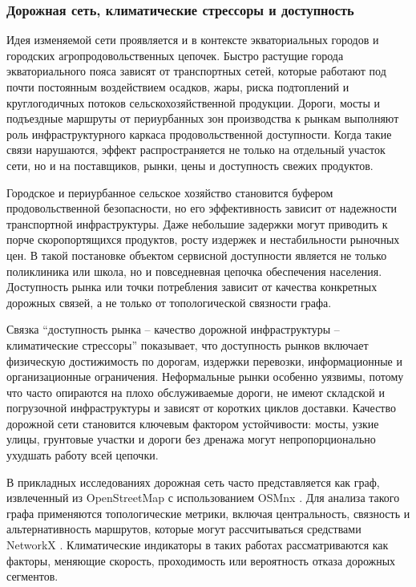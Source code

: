 \subsubsection{Дорожная сеть, климатические стрессоры и доступность}
\label{subsubsec:road-stressors-accessibility}

Идея изменяемой сети проявляется и в контексте экваториальных городов и городских агропродовольственных цепочек. Быстро растущие города экваториального пояса зависят от транспортных сетей, которые работают под почти постоянным воздействием осадков, жары, риска подтоплений и круглогодичных потоков сельскохозяйственной продукции. Дороги, мосты и подъездные маршруты от периурбанных зон производства к рынкам выполняют роль инфраструктурного каркаса продовольственной доступности. Когда такие связи нарушаются, эффект распространяется не только на отдельный участок сети, но и на поставщиков, рынки, цены и доступность свежих продуктов.

Городское и периурбанное сельское хозяйство становится буфером продовольственной безопасности, но его эффективность зависит от надежности транспортной инфраструктуры. Даже небольшие задержки могут приводить к порче скоропортящихся продуктов, росту издержек и нестабильности рыночных цен. В такой постановке объектом сервисной доступности является не только поликлиника или школа, но и повседневная цепочка обеспечения населения. Доступность рынка или точки потребления зависит от качества конкретных дорожных связей, а не только от топологической связности графа.

Связка ``доступность рынка -- качество дорожной инфраструктуры -- климатические стрессоры'' показывает, что доступность рынков включает физическую достижимость по дорогам, издержки перевозки, информационные и организационные ограничения. Неформальные рынки особенно уязвимы, потому что часто опираются на плохо обслуживаемые дороги, не имеют складской и погрузочной инфраструктуры и зависят от коротких циклов доставки. Качество дорожной сети становится ключевым фактором устойчивости: мосты, узкие улицы, грунтовые участки и дороги без дренажа могут непропорционально ухудшать работу всей цепочки.

В прикладных исследованиях дорожная сеть часто представляется как граф, извлеченный из OpenStreetMap с использованием OSMnx \cite{boeing2017osmnx}. Для анализа такого графа применяются топологические метрики, включая центральность, связность и альтернативность маршрутов, которые могут рассчитываться средствами NetworkX \cite{hagberg2008networkx}. Климатические индикаторы в таких работах рассматриваются как факторы, меняющие скорость, проходимость или вероятность отказа дорожных сегментов.

